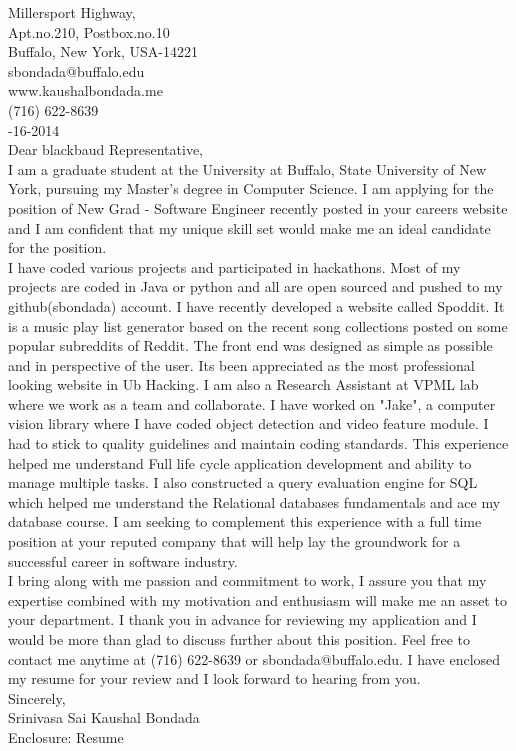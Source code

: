 \documentclass[10pt,letterpaper,oneside]{article}
\begin{document}
 Millersport Highway,\\
Apt.no.210, Postbox.no.10\\
Buffalo, New York, USA-14221\\
sbondada@buffalo.edu\\
www.kaushalbondada.me\\
(716) 622-8639\\

-16-2014\\
 
\noindent Dear blackbaud Representative,\\
 
I am a graduate student at the University at Buffalo, State University of New York, pursuing my Master's degree in Computer Science. I am applying
for the position of New Grad - Software Engineer recently posted in your careers website and I am confident that my unique skill set would 
make me an ideal candidate for the position.\\

I have coded various projects and participated in hackathons. Most of my projects are coded in Java or python and all are open sourced and
pushed to my github(sbondada) account. I have recently developed a website called Spoddit. It is a music play list generator based on the
recent song collections posted on some popular subreddits of Reddit. The front end was designed as simple as possible and in perspective of the
user. Its been appreciated as the most professional looking website in Ub Hacking. I am also a Research Assistant at VPML lab where we work as a 
team and collaborate. I have worked on "Jake", a computer vision library where I have coded object detection and video feature module. I had to 
stick to quality guidelines and maintain coding standards. This experience helped me understand Full life cycle application development and
ability to manage multiple tasks. I also constructed a query evaluation engine for SQL which helped me understand the Relational databases
fundamentals and ace my database course. I am seeking to complement this experience with a full time position at your reputed company that will help lay the groundwork for a successful career in software industry.\\

I bring along with me passion and commitment to work, I assure you that my expertise combined with my motivation
and enthusiasm will make me an asset to your department. I thank you in advance for reviewing my application and I would be more than glad to
discuss further about this position. Feel free to contact me anytime at (716) 622-8639 or sbondada@buffalo.edu. I have enclosed my resume for your review and I look forward to hearing from you.\\
 
\noindent Sincerely,\\
Srinivasa Sai Kaushal Bondada\\
Enclosure: Resume\\
\end{document}
